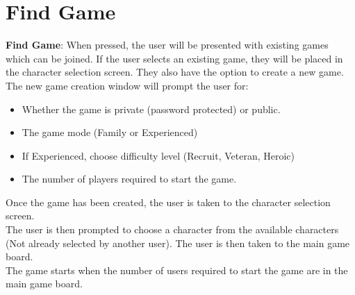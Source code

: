 \documentclass[12pt]{article}
\theoremstyle{definition}
\begin{document}
\part{Find Game}
\textbf{Find Game}: When pressed, the user will be presented with existing games which can be joined. If the user selects an existing game, they will be placed in the character selection screen. They also have the option to create a new game. The new game creation window will prompt the user for:
\begin{itemize}
	\item Whether the game is private (password protected) or public.
	\item The game mode (Family or Experienced)
	\item If Experienced, choose difficulty level (Recruit, Veteran, Heroic)
	\item The number of players required to start the game.
\end{itemize} 
Once the game has been created, the user is taken to the character selection screen.
\\ \linebreak
The user is then prompted to choose a character from the available characters (Not already selected by another user). The user is then taken to the main game board.
\\ \linebreak
The game starts when the number of users required to start the game are in the main game board.
\end{document}
